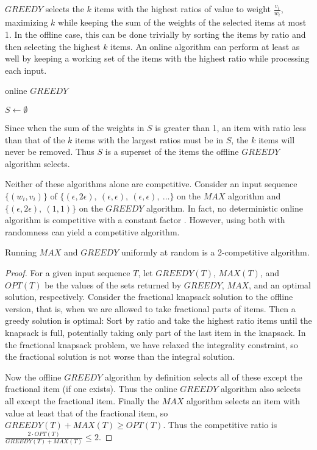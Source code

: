 $GREEDY$ selects the $k$ items with the highest ratios of value to weight $\frac{v_i}{w_i}$, maximizing $k$ while keeping the sum of the weights of the selected items at most 1. In the offline case, this can be done trivially by sorting the items by ratio and then selecting the highest $k$ items. An online algorithm can perform at least as well by keeping a working set of the items with the highest ratio while processing each input.

\begin{algorithm}
	\caption{online $GREEDY$}
	$S \leftarrow \emptyset$\;
\end{algorithm}

Since when the sum of the weights in $S$ is greater than 1, an item with ratio less than that of the $k$ items with the largest ratios must be in $S$, the $k$ items will never be removed. Thus $S$ is a superset of the items the offline $GREEDY$ algorithm selects.

Neither of these algorithms alone are competitive. Consider an input sequence $\{(w_i,v_i)\}$ of $\{(\epsilon,2\epsilon),\ (\epsilon,\epsilon),\ (\epsilon,\epsilon),\ \ldots\}$ on the $MAX$ algorithm and $\{(\epsilon, 2\epsilon),\ (1,1)\}$ on the $GREEDY$ algorithm. In fact, no deterministic online algorithm is competitive with a constant factor \cite{iwama}. However, using both with randomness can yield a competitive algorithm.

\begin{theorem}
	\emph{\cite{han}}
	Running $MAX$ and $GREEDY$ uniformly at random is a 2-competitive algorithm.
\end{theorem}
\begin{proof}
	For a given input sequence $T$, let $GREEDY(T)$, $MAX(T)$, and $OPT(T)$ be the values of the sets returned by $GREEDY$, $MAX$, and an optimal solution, respectively. Consider the fractional knapsack solution to the offline version, that is, when we are allowed to take fractional parts of items. Then a greedy solution is optimal: Sort by ratio and take the highest ratio items until the knapsack is full, potentially taking only part of the last item in the knapsack. In the fractional knapsack problem, we have relaxed the integrality constraint, so the fractional solution is not worse than the integral solution.
	
	Now the offline $GREEDY$ algorithm by definition selects all of these except the fractional item (if one exists). Thus the online $GREEDY$ algorithm also selects all except the fractional item. Finally the $MAX$ algorithm selects an item with value at least that of the fractional item, so $GREEDY(T)+MAX(T) \ge OPT(T)$. Thus the competitive ratio is $\frac{2\cdot OPT(T)}{GREEDY(T)+MAX(T)} \le 2$.
\end{proof}

